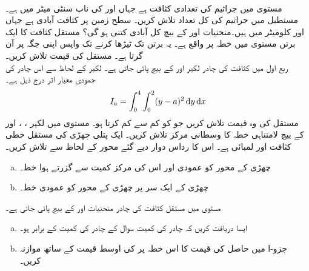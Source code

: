 \\
مستوی  میں جراثیم   کی تعدادی کثافت  ہے جہاں  اور  کی ناپ سنٹی میٹر میں ہے۔ مستطیل  میں جراثیم کی کل تعداد تلاش کریں۔
سطح زمین پر  کثافت آبادی  ہے جہاں  اور  کلومیٹر میں ہیں۔منحنیات  اور  کے بیچ کل آبادی کتنی ہو گی؟
مستقل کثافت کا ایک برتن مستوی  میں خطہ  پر واقع ہے۔ یہ برتن    تک ٹیڑھا کرنے تک واپس اپنی جگہ پر آن گرتا ہے۔ مستقل  کی قیمت تلاش کریں۔
\\
ربع اول میں کثافت  کی چادر  لکیر  اور  کے بیچ  پائی جاتی ہے۔ لکیر  کے لحاظ سے اس چادر کی جمودی معیار اثر  درج ذیل ہے۔
\begin{align*}
I_a=\int_0^4\int_0^2(y-a)^2\dif y\dif x
\end{align*}
مستقل  کی وہ قیمت تلاش کریں جو  کو کم سے کم کرتا ہو۔
مستوی  میں لکیر ، ،  اور   کے بیچ لامتناہی خطہ کا وسطانی مرکز تلاش کریں۔
ایک پتلی چھڑی   کی مستقل  خطی کثافت   اور لمبائی  ہے۔  اس کا رداس دوار  دیے گئے محور کے لحاظ سے تلاش کریں۔
\begin{enumerate}[a.]
\item
چھڑی کے محور کو عمودی اور اس کی مرکز کمیت سے گزرتے ہوا خط۔
\item
چھڑی کے ایک سر پر چھڑی کے محور کو عمودی خط۔ 
\end{enumerate}
مستوی  میں مستقل کثافت   کی چادر منحنیات  اور  کے بیچ پائی جاتی ہے۔
\begin{enumerate}[a.]
\item
ایسا   دریافت کریں کہ چادر کی  کمیت   سوال  کے چادر کی کمیت کے برابر ہو۔
\item
جزو-ا میں حاصل  کی قیمت کا اس خطہ پر   کی اوسط قیمت کے ساتھ موازنہ کریں۔
\end{enumerate}

